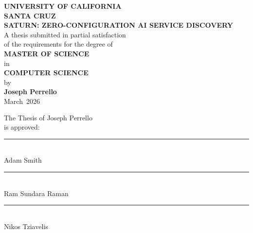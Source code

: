 \documentclass[12pt]{report}
\newcommand{\thesistitle}{Saturn: Zero-Configuration AI Service Discovery}
\newcommand{\authorname}{Joseph Perrello}
\newcommand{\degreename}{Master of Science}
\newcommand{\departmentname}{Computer Science}
\newcommand{\graduationmonth}{March}
\newcommand{\graduationyear}{2026}
\newcommand{\committeechair}{Ram Sundara Raman}
\newcommand{\committeemembertwo}{Adam Smith}
\begin{document}
\thispagestyle{empty}
\begin{center}
    \textbf{UNIVERSITY OF CALIFORNIA}\\
    \textbf{SANTA CRUZ}\\
    \vspace{0.5in}
    \textbf{\MakeUppercase{\thesistitle}}\\
    \vspace{0.5in}
    A thesis submitted in partial satisfaction\\
    of the requirements for the degree of\\
    \vspace{0.25in}
    \textbf{\MakeUppercase{\degreename}}\\
    \vspace{0.25in}
    in\\
    \vspace{0.25in}
    \textbf{\MakeUppercase{\departmentname}}\\
    \vspace{0.25in}
    by\\
    \vspace{0.25in}
    \textbf{\authorname}\\
    \vspace{0.5in}
    \graduationmonth\ \graduationyear
\end{center}
\newpage

\thispagestyle{empty}
\begin{center}
    \vspace*{1in}
    \begin{flushleft}
    \hspace{3in} The Thesis of \authorname\\
    \hspace{3in} is approved:\\
    \vspace{0.5in}
    \hspace{3in} \rule{2.5in}{0.4pt}\\
    \hspace{3in} \committeemembertwo\\
    \vspace{0.5in}
    \hspace{3in} \rule{2.5in}{0.4pt}\\
    \hspace{3in} \committeechair\\
    \vspace{0.5in}
    \hspace{3in} \rule{2.5in}{0.4pt}\\
    \hspace{3in} Nikos Tziavelis
    \end{flushleft}
\end{center}
\newpage
\end{document}

